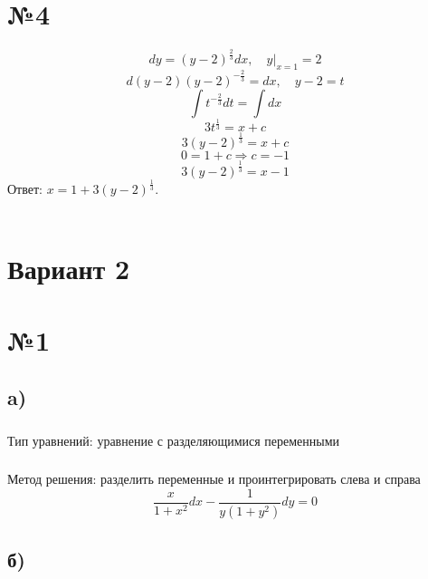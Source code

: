 \documentclass{article}
\begin{document}
\section*{№4}
\begin{equation*}
    dy=(y-2)^{\frac{2}{3}}dx,\quad y|_{x=1}=2
\end{equation*}
\begin{equation*}
    d(y-2)(y-2)^{-\frac{2}{3}}=dx, \quad y-2=t
\end{equation*}
\begin{equation*}
    \int t^{-\frac{2}{3}}dt=\int dx
\end{equation*}
\begin{equation*}
    3t^{\frac{1}{3}}=x+c
\end{equation*}
\begin{equation*}
    3(y-2)^{\frac{1}{3}}=x+c
\end{equation*}
\begin{equation*}
    0=1+c \Rightarrow c=-1
\end{equation*}
\begin{equation*}
    3(y-2)^{\frac{1}{3}}=x-1
\end{equation*}
Ответ: $x=1+3(y-2)^{\frac{1}{3}}$.
\\ \\
\section*{Вариант 2}
\section*{№1}
\subsection*{a)}
\subsubsection*{} 
Тип уравнений: уравнение с разделяющимися переменными
\subsubsection*{}
Метод решения: разделить переменные и проинтегрировать слева и справа
\begin{equation*}
\frac{x}{1 + x^2}dx - \frac{1}{y(1+y^2)}dy = 0
\end{equation*}

\subsection*{б)}
\end{document}
